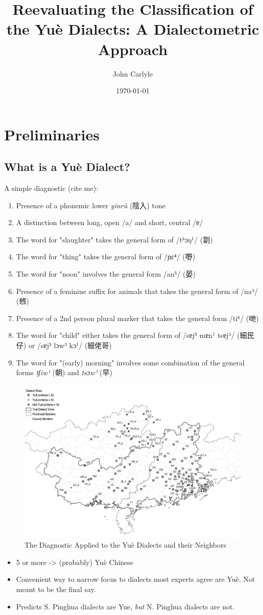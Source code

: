 \documentclass[a4paper,12pt]{article}
\author{John Carlyle}
\date{\today}
\title{Reevaluating the Classification of the Yuè Dialects: A Dialectometric Approach}
\begin{document}
\section*{Preliminaries}
\label{sec:orgdf477c5}

\subsection*{What is a Yuè Dialect?}
\label{sec:orgf10f758}

A simple diagnostic (cite me):

\begin{enumerate}
\item Presence of a phonemic lower \emph{yīnrù} (陰入) tone
\item A distinction between long, open /a/ and short, central /ɐ/
\item The word for "slaughter" takes the general form of /tʰɔŋ¹/ (劏)
\item The word for "thing" takes the general form of /ɲɛ⁴/ (嘢)
\item The word for "noon" involves the general form /an⁵/ (晏)
\item Presence of a feminine suffix for animals that takes the general form of /na³/ (乸)
\item Presence of a 2nd person plural marker that takes the general form /ti⁶/ (哋)
\item The word for "child" either takes the general form of /sɐj⁵ mɐn¹ tsɐj³/ (細民仔) or /sɐj⁵ lɔw³ kɔ¹/ (細佬哥)
\item The word for "(early) morning" involves some combination of the general forms \emph{tʃiw¹} (朝) and \emph{tsɔw³} (早)
\end{enumerate}

\begin{figure}[htbp]
\centering
\includegraphics[width=.9\linewidth]{./cy_all_lex.png}
\caption{\label{fig:orgcbf50cd}The Diagnostic Applied to the Yuè Dialects and their Neighbors}
\end{figure}

\begin{itemize}
\item 5 or more -> (probably) Yuè Chinese
\item Convenient way to narrow focus to dialects most experts agree are Yuè. Not meant to be the final say.
\item Predicts S. Pinghua dialects are Yue, \emph{but} N. Pinghua dialects are not.
\end{itemize}



\newpage
\printbibliography
\end{document}
